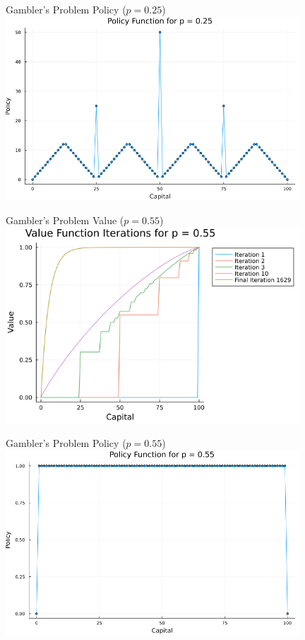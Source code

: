 \documentclass{beamer}
\begin{document}
\begin{frame}{Gambler's Problem Policy ($p = 0.25$)}
	\includegraphics[width=11cm]{gamblers_problem_policy_p025.png}
\end{frame}
\begin{frame}{Gambler's Problem Value ($p = 0.55$)}
	\includegraphics[width=11cm]{gamblers_problem_value_p055.png}
\end{frame}
\begin{frame}{Gambler's Problem Policy ($p = 0.55$)}
	\includegraphics[width=11cm]{gamblers_problem_policy_p055.png}
\end{frame}
\end{document}
